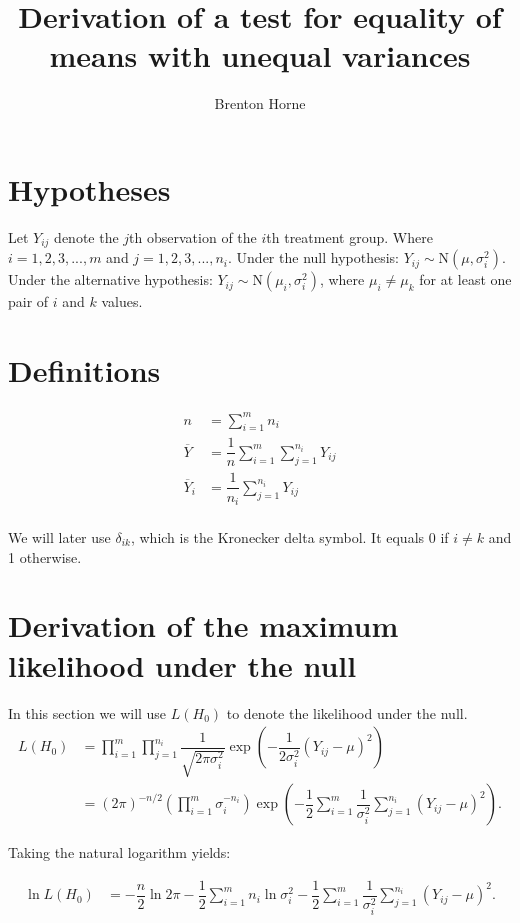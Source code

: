 \documentclass[12pt,a4paper,openright]{article}
\title{Derivation of a test for equality of means with unequal variances}
\author{Brenton Horne}
\begin{document}
	\maketitle
	
	\tableofcontents
	
	\newpage
	
	\section{Hypotheses}
	Let $Y_{ij}$ denote the $j$th observation of the $i$th treatment group. Where $i=1, 2, 3, ..., m$ and $j=1, 2, 3, ..., n_i$. Under the null hypothesis: $Y_{ij} \sim \mathrm{N}(\mu, \sigma_i^2)$. Under the alternative hypothesis: $Y_{ij} \sim \mathrm{N}(\mu_i, \sigma_i^2)$, where $\mu_i \neq \mu_k$ for at least one pair of $i$ and $k$ values.
	
	\section{Definitions}
	\begin{align*}
	n &= \sum_{i=1}^m n_i \\
	\overline{Y} &= \dfrac{1}{n} \sum_{i=1}^m \sum_{j=1}^{n_i} Y_{ij} \\
	\overline{Y}_i &= \dfrac{1}{n_i} \sum_{j=1}^{n_i} Y_{ij} \\
	\end{align*}

	We will later use $\delta_{ik}$, which is the Kronecker delta symbol. It equals 0 if $i\neq k$ and 1 otherwise.
	
	\section{Derivation of the maximum likelihood under the null}
	In this section we will use $L(H_0)$ to denote the likelihood under the null.
	\begin{align}
		L(H_0) &= \prod_{i=1}^m \prod_{j=1}^{n_i} \dfrac{1}{\sqrt{2\pi \sigma^2_i}} \exp\left(-\dfrac{1}{2\sigma^2_i}(Y_{ij}-\mu)^2\right) \nonumber\\
		&= (2\pi)^{-n/2} \left(\prod_{i=1}^m \sigma_i^{-n_i}\right)\exp\left(-\dfrac{1}{2} \sum_{i=1}^m \dfrac{1}{\sigma_i^2}\sum_{j=1}^{n_i}(Y_{ij}-\mu)^2 \right). \label{LH0}
	\end{align}

	Taking the natural logarithm yields:
	
	\begin{align*}
		\ln{L(H_0)} &= -\dfrac{n}{2}\ln{2\pi} - \dfrac{1}{2}\sum_{i=1}^m n_i \ln{\sigma^2_i} - \dfrac{1}{2} \sum_{i=1}^m \dfrac{1}{\sigma^2_i}\sum_{j=1}^{n_i} (Y_{ij}-\mu)^2.
	\end{align*}
\end{document}
